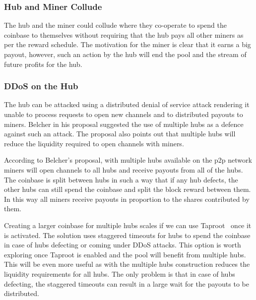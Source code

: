 \documentclass{article}
\begin{document}
\subsubsection{Hub and Miner Collude}\label{ref:collusion}

The hub and the miner could collude where they co-operate to spend the
coinbase to themselves without requiring that the hub pays all other
miners as per the reward schedule. The motivation for the miner is
clear that it earns a big payout, however, such an action by the hub
will end the pool and the stream of future profits for the hub.


\subsubsection{DDoS on the Hub}\label{ref:ddos-attack}

The hub can be attacked using a distributed denial of service attack
rendering it unable to process requests to open new channels and to
distributed payouts to miners. Belcher in his proposal suggested the
use of multiple hubs as a defence against such an attack. The proposal
also points out that multiple hubs will reduce the liquidity required
to open channels with miners.

According to Belcher's proposal, with multiple hubs available on the
p2p network miners will open channels to all hubs and receive payouts
from all of the hubs. The coinbase is split between hubs in such a way
that if any hub defects, the other hubs can still spend the coinbase
and split the block reward between them. In this way all miners
receive payouts in proportion to the shares contributed by them.

Creating a larger coinbase for multiple hubs scales if we can use
Taproot~\cite{bip340,bip341, bip342} once it is activated. The
solution uses staggered timeouts for hubs to spend the coinbase in
case of hubs defecting or coming under DDoS attacks. This option is
worth exploring once Taproot is enabled and the pool will benefit from
multiple hubs. This will be even more useful as with the multiple hubs
construction reduces the liquidity requirements for all hubs. The only
problem is that in case of hubs defecting, the staggered timeouts can
result in a large wait for the payouts to be distributed.
\end{document}

